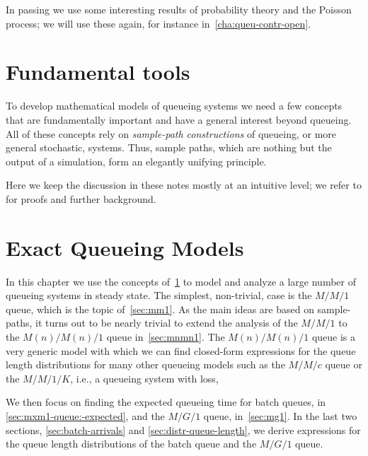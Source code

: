In passing we use some interesting results of probability theory and the Poisson process; we will use these again, for instance in~\cref{cha:queu-contr-open}. 







\chapter{Fundamental tools}
\label{cha:fundamental-tools}


To develop mathematical models of queueing systems we need a few concepts that are fundamentally important and have a general interest beyond queueing.
All of these concepts rely on \emph{sample-path constructions} of queueing, or more general stochastic, systems.
Thus, sample paths, which are nothing but the output of a simulation, form an elegantly unifying principle. 

Here we keep the discussion in these notes mostly at an intuitive level; we refer to \cite{el-taha98:_sampl_path_analy_queuein_system} for proofs and further background.








\chapter{Exact Queueing Models}
\label{cha:analytical-models}

In this chapter we use the concepts of~\cref{cha:fundamental-tools} to model and analyze a large number of queueing systems in steady state.
The simplest, non-trivial, case is the $M/M/1$ queue, which is the topic of~\cref{sec:mm1}.
As the main ideas are based on sample-paths, it turns out to be  nearly trivial to extend the analysis of the $M/M/1$ to the $M(n)/M(n)/1$ queue in~\cref{sec:mnmn1}.
The $M(n)/M(n)/1$ queue is a very generic model  with which we can find closed-form expressions for the queue length distributions for many other queueing models such as the $M/M/c$ queue or the $M/M/1/K$, i.e., a queueing system with loss,

We then focus on finding the expected queueing time for batch queues, in \cref{sec:mxm1-queue:-expected}, and the $M/G/1$ queue, in~\cref{sec:mg1}. 
In the last two sections,  \cref{sec:batch-arrivals} and \cref{sec:distr-queue-length}, we derive expressions for the queue length distributions of the batch queue and the $M/G/1$ queue. 

